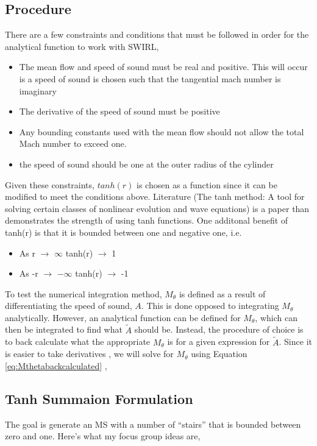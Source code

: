 
\subsection{Procedure}
There are a few constraints and conditions that must be followed in order for the analytical 
function to work with SWIRL, 

\begin{itemize}
    \item The mean flow and speed of sound must be real and positive. This will 
        occur is a speed of sound is chosen such that the tangential mach number
        is imaginary
    \item The derivative of the speed of sound must be positive
    \item Any bounding constants used with the mean flow should not allow the 
        total Mach number to exceed one.
    \item the speed of sound should be one at the outer radius of the cylinder
\end{itemize}

Given these constraints, $tanh(r)$ is chosen as a function since it can be
modified to meet the conditions above. Literature (The tanh method: A tool for 
solving certain classes of nonlinear evolution and wave equations) 
is a paper than demonstrates the strength of using tanh functions.
One additonal benefit of tanh(r) is that it is bounded between one and negative one, i.e.

\begin{itemize}
    \item As r $\rightarrow$ $\infty$ tanh(r) $\rightarrow$ 1
    \item As -r $\rightarrow$ $-\infty$ tanh(r) $\rightarrow$ -1
\end{itemize}

To test the numerical integration method,  $M_{\theta}$ is defined as a result 
of differentiating the speed of sound, $A$. This is done opposed to integrating
$M_{\theta}$ analytically. However, an analytical function can be defined for
$M_{\theta}$, which can then be integrated to find what $\widetilde{A}$ should be. 
Instead, the procedure of choice is to back calculate what the appropriate 
$M_{\theta}$ is for a given expression for $\widetilde{A}$.  Since it is easier 
to take derivatives , we will solve for $M_{\theta}$ using Equation \ref{eq:Mthetabackcalculated} ,

\subsection{Tanh Summaion Formulation}
The goal is generate an MS with a number of ``stairs'' that is bounded between
zero and one. Here's what my focus group ideas are,

